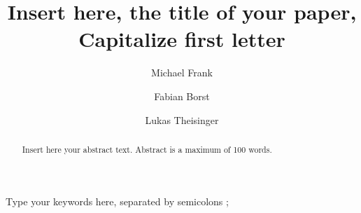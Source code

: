 \documentclass[5p,times,procedia]{Definitions/elsarticle}
\begin{document}
\begin{frontmatter}



%

\title{Insert here, the title of your paper, Capitalize first letter}




\author[a]{Michael Frank\corref{*}} 
\author[a]{Fabian Borst}
\author[a]{Lukas Theisinger}

\address[a]{First affiliation, Address, City and Postcode, Country}


\begin{abstract}
Insert here your abstract text. Abstract is a maximum of 100 words.
\end{abstract}

\begin{keyword}
Type your keywords here, separated by semicolons ; 




\end{keyword}

\end{frontmatter}
\end{document}
